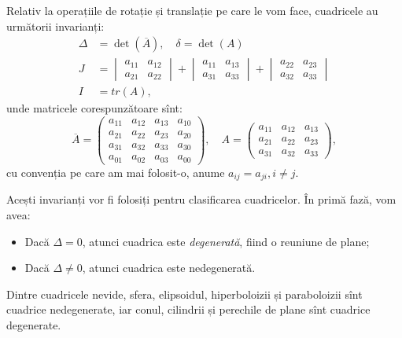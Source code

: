 \documentclass[11pt,a4paper]{article}
\theoremstyle{dotless}
\theoremstyle{dotlessdr}
\begin{document}
Relativ la operațiile de rotație și translație pe care le vom face, cuadricele
au următorii invarianți:
\begin{align*}
	\Delta &= \det(\overline{A}), \quad \delta = \det(A) \\
	J &= \begin{vmatrix}
	         a_{11} & a_{12} \\
	         a_{21} & a_{22}
         \end{vmatrix} + 
         \begin{vmatrix}
	         a_{11} & a_{13} \\
	         a_{31} & a_{33} 
         \end{vmatrix} + 
         \begin{vmatrix}
	         a_{22} & a_{23} \\
	         a_{32} & a_{33}
         \end{vmatrix} \\
    I &= tr(A),
\end{align*}
unde matricele corespunzătoare sînt: 
 \[
	\overline{A} = \begin{pmatrix}
	                   a_{11} & a_{12} & a_{13} & a_{10} \\
	                   a_{21} & a_{22} & a_{23} & a_{20} \\
	                   a_{31} & a_{32} & a_{33} & a_{30} \\
	                   a_{01} & a_{02} & a_{03} & a_{00}
                   \end{pmatrix}, \quad
    A = \begin{pmatrix}
	        a_{11} & a_{12} & a_{13} \\
	        a_{21} & a_{22} & a_{23} \\
	        a_{31} & a_{32} & a_{33}
        \end{pmatrix},
\]
cu convenția pe care am mai folosit-o, anume $a_{ij} = a_{ji}, i \neq j$.

Acești invarianți vor fi folosiți pentru clasificarea cuadricelor. În primă
fază, vom avea:
\begin{itemize}
	\item Dacă $\Delta = 0$, atunci cuadrica este \emph{degenerată}, fiind o
reuniune de plane;  
    \item Dacă $\Delta \neq 0$, atunci cuadrica este nedegenerată.
\end{itemize}

Dintre cuadricele nevide, sfera, elipsoidul, hiperboloizii și paraboloizii
sînt cuadrice nedegenerate, iar conul, cilindrii și perechile de plane sînt
cuadrice degenerate.
\end{document}
